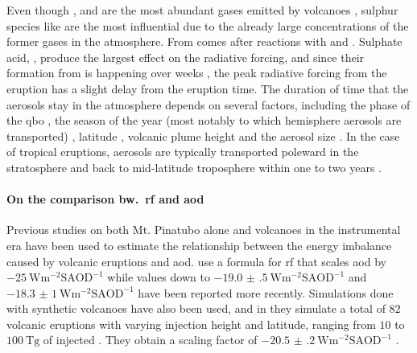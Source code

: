 \documentclass{ametsocV5}
\newcommand{\iso}[1][i]{{#1}njected \ce{SO2}}
\begin{document}
Even though ,  and  are the most abundant gases emitted by
volcanoes \citep{robock2000}, sulphur species like  are the most influential due
to the already large concentrations of the former gases in the atmosphere. From 
comes  after reactions with  and  \citep{robock2000}. Sulphate
acid, , produce the largest effect on the radiative forcing, and since their
formation from  is happening over weeks \citep{robock2000}, the peak radiative
forcing from the eruption has a slight delay from the eruption time. The duration of
time that the  aerosols stay in the atmosphere depends on several factors,
including the phase of the \acrshort{qbo} \citep{pitari2016b}, the season of the year
(most notably to which hemisphere aerosols are transported)
\citep{toohey2011,toohey2019}, latitude \citep{marshall2019,toohey2019}, volcanic plume
height \citep{marshall2019} and the aerosol size \citep{marshall2019}. In the case of tropical
eruptions, aerosols are typically transported poleward in the stratosphere and back to
mid-latitude troposphere within one to two years \citep{robock2000}.


\paragraph*{On the comparison bw.\ \acrshort{rf} and \acrshort{aod}}

Previous studies on both Mt. Pinatubo alone \citep{mills2017,hansen2005} and volcanoes
in the instrumental era \citep{gregory2016} have been used to estimate the relationship
between the energy imbalance caused by volcanic eruptions and \acrshort{aod}.
\citet{myhre2013} use a formula for \acrshort{rf} that scales \acrshort{aod} by
\(\SI{-25}{\watt\metre^{-2}\mathrm{SAOD}^{-1}}\) while values down to
\(\SI{-19.0(5)}{\watt\metre^{-2}\mathrm{SAOD}^{-1}}\) \citep{gregory2016} and
\(\SI{-18.3(10)}{\watt\metre^{-2}\mathrm{SAOD}^{-1}}\) \citep{mills2017} have been
reported more recently. Simulations done with synthetic volcanoes have also been used,
and in \citet{marshall2020} they simulate a total of \(82\) volcanic eruptions with
varying injection height and latitude, ranging from \(10\) to \(\SI{100}{\tera\gram}\)
of \iso{}. They obtain a scaling factor of
\(\SI{-20.5(2)}{\watt\metre^{-2}\mathrm{SAOD}^{-1}}\) \citep{marshall2020}.
\end{document}
